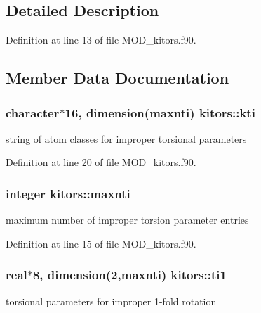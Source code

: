 \subsection{Detailed Description}


Definition at line 13 of file M\-O\-D\-\_\-kitors.\-f90.



\subsection{Member Data Documentation}
\hypertarget{classkitors_ad580d974a26e62c40b0e0916ba8ca99d}{
\subsubsection[{kti}]{\setlength{\rightskip}{0pt plus 5cm}character$\ast$16, dimension({\bf maxnti}) kitors\-::kti}}\label{classkitors_ad580d974a26e62c40b0e0916ba8ca99d}


string of atom classes for improper torsional parameters 



Definition at line 20 of file M\-O\-D\-\_\-kitors.\-f90.

\hypertarget{classkitors_aa0169a31241c5476adff2877e35702d2}{
\subsubsection[{maxnti}]{\setlength{\rightskip}{0pt plus 5cm}integer kitors\-::maxnti}}\label{classkitors_aa0169a31241c5476adff2877e35702d2}


maximum number of improper torsion parameter entries 



Definition at line 15 of file M\-O\-D\-\_\-kitors.\-f90.

\hypertarget{classkitors_af3a23286166131a2ba254e4c52a79271}{
\subsubsection[{ti1}]{\setlength{\rightskip}{0pt plus 5cm}real$\ast$8, dimension(2,{\bf maxnti}) kitors\-::ti1}}\label{classkitors_af3a23286166131a2ba254e4c52a79271}


torsional parameters for improper 1-\/fold rotation 




